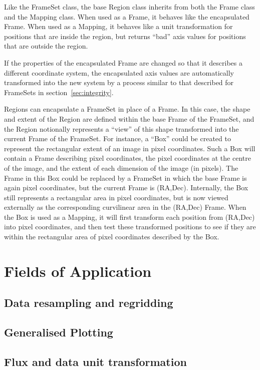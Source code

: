\documentclass[final,authoryear,5p,times,twocolumn]{elsarticle}
\begin{document}
Like the FrameSet class, the base Region class inherits from both the
Frame class and the Mapping class. When used as a Frame, it behaves like
the encapsulated Frame. When used as a Mapping, it behaves like a unit
transformation for positions that are inside the region, but returns
``bad'' axis values for positions that are outside the region.

If the properties of the encapsulated Frame are changed so that it
describes a different coordinate system, the encapsulated axis values are
automatically transformed into the new system by a process similar to
that described for FrameSets in section~\ref{sec:integrity}.

Regions can encapsulate a FrameSet in place of a Frame. In this case, the
shape and extent of the Region are defined within the base Frame of the
FrameSet, and the Region notionally represents a ``view'' of this shape
transformed into the current Frame of the FrameSet. For instance, a
``Box'' could be created to represent the rectangular extent of an image
in pixel coordinates. Such a Box will contain a Frame describing pixel
coordinates, the pixel coordinates at the centre of the image, and the
extent of each dimension of the image (in pixels). The Frame in this Box
could be replaced by a FrameSet in which the base Frame is again pixel
coordinates, but the current Frame is (RA,Dec). Internally, the Box still
represents a rectangular area in pixel coordinates, but is now viewed
externally as the corresponding curvilinear area in the (RA,Dec) Frame.
When the Box is used as a Mapping, it will first transform each position
from (RA,Dec) into pixel coordinates, and then test these transformed
positions to see if they are within the rectangular area of pixel
coordinates described by the Box.

\section{Fields of Application}

\subsection{Data resampling and regridding}

\subsection{Generalised Plotting}

\subsection{Flux and data unit transformation}
\end{document}
